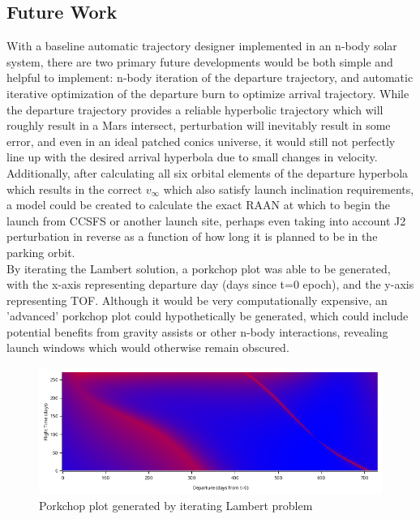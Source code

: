 \documentclass[conference]{IEEEtran}
\begin{document}
	\subsection{Future Work}
	
	With a baseline automatic trajectory designer implemented in an n-body solar system, there are two primary future developments would be both simple and helpful to implement: n-body iteration of the departure trajectory, and automatic iterative optimization of the departure burn to optimize arrival trajectory. While the departure trajectory provides a reliable hyperbolic trajectory which will roughly result in a Mars intersect, perturbation will inevitably result in some error, and even in an ideal patched conics universe, it would still not perfectly line up with the desired arrival hyperbola due to small changes in velocity.\\
	
	Additionally, after calculating all six orbital elements of the departure hyperbola which results in the correct $v_{\infty}$ which also satisfy launch inclination requirements, a model could be created to calculate the exact RAAN at which to begin the launch from CCSFS or another launch site, perhaps even taking into account J2 perturbation in reverse as a function of how long it is planned to be in the parking orbit. \\
	
	By iterating the Lambert solution, a porkchop plot was able to be generated, with the x-axis representing departure day (days since t=0 epoch), and the y-axis representing TOF. Although it would be very computationally expensive, an 'advanced' porkchop plot could hypothetically be generated, which could include potential benefits from gravity assists or other n-body interactions, revealing launch windows which would otherwise remain obscured. 
	
	\begin{figure}[H]
		\centerline{\includegraphics[width=\linewidth]{fig3.png}}
		\caption{Porkchop plot generated by iterating Lambert problem}
		\label{fig3}
	\end{figure}
	
\end{document}
